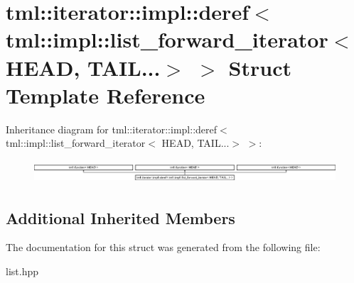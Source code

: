 \hypertarget{structtml_1_1iterator_1_1impl_1_1deref_3_01tml_1_1impl_1_1list__forward__iterator_3_01HEAD_00_01TAIL_8_8_8_4_01_4}{\section{tml\+:\+:iterator\+:\+:impl\+:\+:deref$<$ tml\+:\+:impl\+:\+:list\+\_\+forward\+\_\+iterator$<$ H\+E\+A\+D, T\+A\+I\+L...$>$ $>$ Struct Template Reference}
\label{structtml_1_1iterator_1_1impl_1_1deref_3_01tml_1_1impl_1_1list__forward__iterator_3_01HEAD_00_01TAIL_8_8_8_4_01_4}
}
Inheritance diagram for tml\+:\+:iterator\+:\+:impl\+:\+:deref$<$ tml\+:\+:impl\+:\+:list\+\_\+forward\+\_\+iterator$<$ H\+E\+A\+D, T\+A\+I\+L...$>$ $>$\+:\begin{figure}[H]
\begin{center}
\leavevmode
\includegraphics[height=0.864197cm]{structtml_1_1iterator_1_1impl_1_1deref_3_01tml_1_1impl_1_1list__forward__iterator_3_01HEAD_00_01TAIL_8_8_8_4_01_4}
\end{center}
\end{figure}
\subsection*{Additional Inherited Members}


The documentation for this struct was generated from the following file\+:\begin{DoxyCompactItemize}
\item 
list.\+hpp\end{DoxyCompactItemize}
